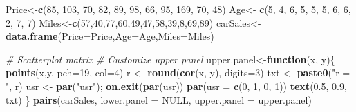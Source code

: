 \documentclass[
]{article}
\newenvironment{Shaded}{\begin{snugshade}}{\end{snugshade}}
\newcommand{\AttributeTok}[1]{\textcolor[rgb]{0.13,0.29,0.53}{#1}}
\newcommand{\CommentTok}[1]{\textcolor[rgb]{0.56,0.35,0.01}{\textit{#1}}}
\newcommand{\ConstantTok}[1]{\textcolor[rgb]{0.56,0.35,0.01}{#1}}
\newcommand{\ControlFlowTok}[1]{\textcolor[rgb]{0.13,0.29,0.53}{\textbf{#1}}}
\newcommand{\DecValTok}[1]{\textcolor[rgb]{0.00,0.00,0.81}{#1}}
\newcommand{\FloatTok}[1]{\textcolor[rgb]{0.00,0.00,0.81}{#1}}
\newcommand{\FunctionTok}[1]{\textcolor[rgb]{0.13,0.29,0.53}{\textbf{#1}}}
\newcommand{\NormalTok}[1]{#1}
\newcommand{\OtherTok}[1]{\textcolor[rgb]{0.56,0.35,0.01}{#1}}
\newcommand{\StringTok}[1]{\textcolor[rgb]{0.31,0.60,0.02}{#1}}
\begin{document}
\begin{Shaded}
\begin{Highlighting}[]
\NormalTok{Price}\OtherTok{\textless{}{-}}\FunctionTok{c}\NormalTok{(}\DecValTok{85}\NormalTok{, }\DecValTok{103}\NormalTok{,  }\DecValTok{70}\NormalTok{,  }\DecValTok{82}\NormalTok{,  }\DecValTok{89}\NormalTok{,  }\DecValTok{98}\NormalTok{,  }\DecValTok{66}\NormalTok{,  }\DecValTok{95}\NormalTok{, }\DecValTok{169}\NormalTok{,  }\DecValTok{70}\NormalTok{,  }\DecValTok{48}\NormalTok{)}
\NormalTok{Age}\OtherTok{\textless{}{-}} \FunctionTok{c}\NormalTok{(}\DecValTok{5}\NormalTok{, }\DecValTok{4}\NormalTok{, }\DecValTok{6}\NormalTok{, }\DecValTok{5}\NormalTok{, }\DecValTok{5}\NormalTok{, }\DecValTok{5}\NormalTok{, }\DecValTok{6}\NormalTok{, }\DecValTok{6}\NormalTok{, }\DecValTok{2}\NormalTok{, }\DecValTok{7}\NormalTok{, }\DecValTok{7}\NormalTok{)}
\NormalTok{Miles}\OtherTok{\textless{}{-}}\FunctionTok{c}\NormalTok{(}\DecValTok{57}\NormalTok{,}\DecValTok{40}\NormalTok{,}\DecValTok{77}\NormalTok{,}\DecValTok{60}\NormalTok{,}\DecValTok{49}\NormalTok{,}\DecValTok{47}\NormalTok{,}\DecValTok{58}\NormalTok{,}\DecValTok{39}\NormalTok{,}\DecValTok{8}\NormalTok{,}\DecValTok{69}\NormalTok{,}\DecValTok{89}\NormalTok{)}
\NormalTok{carSales}\OtherTok{\textless{}{-}}\FunctionTok{data.frame}\NormalTok{(}\AttributeTok{Price=}\NormalTok{Price,}\AttributeTok{Age=}\NormalTok{Age,}\AttributeTok{Miles=}\NormalTok{Miles)}


\CommentTok{\# Scatterplot matrix}
\CommentTok{\# Customize upper panel}
\NormalTok{upper.panel}\OtherTok{\textless{}{-}}\ControlFlowTok{function}\NormalTok{(x, y)\{}
  \FunctionTok{points}\NormalTok{(x,y, }\AttributeTok{pch=}\DecValTok{19}\NormalTok{, }\AttributeTok{col=}\DecValTok{4}\NormalTok{)}
\NormalTok{  r }\OtherTok{\textless{}{-}} \FunctionTok{round}\NormalTok{(}\FunctionTok{cor}\NormalTok{(x, y), }\AttributeTok{digits=}\DecValTok{3}\NormalTok{)}
\NormalTok{  txt }\OtherTok{\textless{}{-}} \FunctionTok{paste0}\NormalTok{(}\StringTok{"r = "}\NormalTok{, r)}
\NormalTok{  usr }\OtherTok{\textless{}{-}} \FunctionTok{par}\NormalTok{(}\StringTok{"usr"}\NormalTok{); }\FunctionTok{on.exit}\NormalTok{(}\FunctionTok{par}\NormalTok{(usr))}
  \FunctionTok{par}\NormalTok{(}\AttributeTok{usr =} \FunctionTok{c}\NormalTok{(}\DecValTok{0}\NormalTok{, }\DecValTok{1}\NormalTok{, }\DecValTok{0}\NormalTok{, }\DecValTok{1}\NormalTok{))}
  \FunctionTok{text}\NormalTok{(}\FloatTok{0.5}\NormalTok{, }\FloatTok{0.9}\NormalTok{, txt)}
\NormalTok{\}}
\FunctionTok{pairs}\NormalTok{(carSales, }\AttributeTok{lower.panel =} \ConstantTok{NULL}\NormalTok{, }
      \AttributeTok{upper.panel =}\NormalTok{ upper.panel)}
\end{Highlighting}
\end{Shaded}
\end{document}
